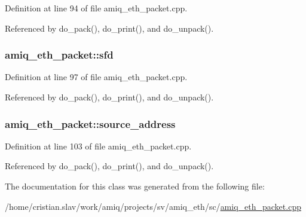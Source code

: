 Definition at line 94 of file amiq\_\-eth\_\-packet.cpp.

Referenced by do\_\-pack(), do\_\-print(), and do\_\-unpack().\hypertarget{classamiq__eth__packet_a03b98e9cda79e6715ac4b38f2ca51569}{
\subsubsection[{sfd}]{ {\bf amiq\_\-eth\_\-packet::sfd}}}
\label{classamiq__eth__packet_a03b98e9cda79e6715ac4b38f2ca51569}


Definition at line 97 of file amiq\_\-eth\_\-packet.cpp.

Referenced by do\_\-pack(), do\_\-print(), and do\_\-unpack().\hypertarget{classamiq__eth__packet_a04153feceffaf9c897706f2143261980}{
\subsubsection[{source\_\-address}]{ {\bf amiq\_\-eth\_\-packet::source\_\-address}}}
\label{classamiq__eth__packet_a04153feceffaf9c897706f2143261980}


Definition at line 103 of file amiq\_\-eth\_\-packet.cpp.

Referenced by do\_\-pack(), do\_\-print(), and do\_\-unpack().

The documentation for this class was generated from the following file:\begin{DoxyCompactItemize}
\item 
/home/cristian.slav/work/amiq/projects/sv/amiq\_\-eth/sc/\hyperlink{amiq__eth__packet_8cpp}{amiq\_\-eth\_\-packet.cpp}\end{DoxyCompactItemize}
